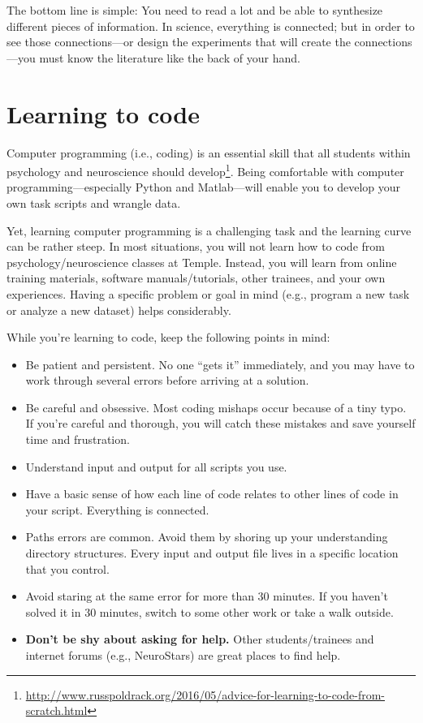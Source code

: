 \documentclass[letterpaper,12pt,oneside]{memoir}
\begin{document}
\begin{shaded}
\noindent The bottom line is simple: You need to read a lot and be able to synthesize different pieces of information. In science, everything is connected; but in order to see those connections---or design the experiments that will create the connections---you must know the literature like the back of your hand.
\end{shaded}


\section{Learning to code}
\label{sec:coding}

Computer programming (i.e., coding) is an essential skill that all students within psychology and neuroscience should develop\footnote{\url{http://www.russpoldrack.org/2016/05/advice-for-learning-to-code-from-scratch.html}}. Being comfortable with computer programming---especially Python and Matlab---will enable you to develop your own task scripts and wrangle data. 

Yet, learning computer programming is a challenging task and the learning curve can be rather steep. In most situations, you will not learn how to code from psychology/neuroscience classes at Temple. Instead, you will learn from online training materials, software manuals/tutorials, other trainees, and your own experiences. Having a specific problem or goal in mind (e.g., program a new task or analyze a new dataset) helps considerably.

While you're learning to code, keep the following points in mind:

\begin{itemize}

\item Be patient and persistent. No one ``gets it'' immediately, and you may have to work through several errors before arriving at a solution. 
\item Be careful and obsessive. Most coding mishaps occur because of a tiny typo. If you're careful and thorough, you will catch these mistakes and save yourself time and frustration. 
\item Understand input and output for all scripts you use.
\item Have a basic sense of how each line of code relates to other lines of code in your script. Everything is connected. 
\item Paths errors are common. Avoid them by shoring up your understanding directory structures. Every input and output file lives in a specific location that you control. 
\item Avoid staring at the same error for more than 30 minutes. If you haven't solved it in 30 minutes, switch to some other work or take a walk outside.
\item \textbf{Don't be shy about asking for help.} Other students/trainees and internet forums (e.g., NeuroStars) are great places to find help.

\end{itemize}
\end{document}
